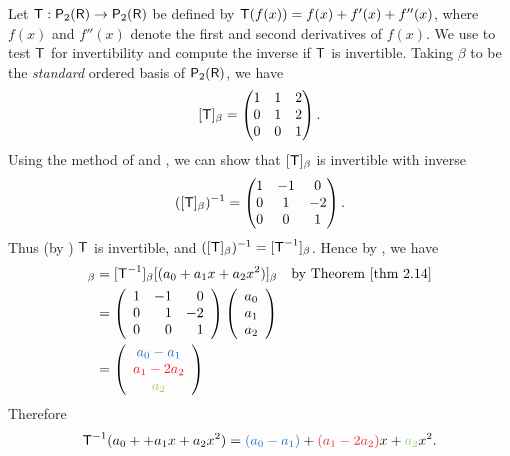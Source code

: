 \begin{example} \label{example 3.2.7}
Let \(\textsf{T}: \textsf{P}_2(\textsf{R}) \to \textsf{P}_2(\textsf{R})\) be defined by \(\textsf{T}(f(x)) = f(x) + f'(x) + f''(x)\),
where \(f(x)\) and \(f''(x)\) denote the first and second derivatives of \(f(x)\).
We use  to test \(\textsf{T}\) for invertibility and compute the inverse if \(\textsf{T}\) is invertible.
Taking \(\beta\) to be the \emph{standard} ordered basis of \(\textsf{P}_2(\textsf{R})\), we have
\[
    [\textsf{T}]_{\beta} = \begin{pmatrix}
        1 & 1 & 2 \\ 0 & 1 & 2 \\ 0 & 0 & 1
    \end{pmatrix}.
\]
Using the method of  and , we can show that \([\textsf{T}]_{\beta}\) is invertible with inverse
\[
    ([\textsf{T}]_{\beta})^{-1} = \begin{pmatrix}
        1 & -1 & 0 \\ 0 & 1 & -2 \\ 0 & 0 & 1
    \end{pmatrix}.
\]
Thus (by ) \(\textsf{T}\) is invertible, and \(([\textsf{T}]_{\beta})^{-1} = [\textsf{T}^{-1}]_{\beta}\).
Hence by , we have
\begin{align*}
    [\T^{-1}(a_0 + a_1 x + a_2 x^2)]_{\beta}
        & = [\T^{-1}]_{\beta} [(a_0 + a_1 x + a_2 x^2)]_{\beta} & \text{by \THM{2.14}} \\
        & = \left(\begin{array}{rrr}
                1 & -1 & 0 \\
                0 & 1 & -2 \\
                0 & 0 & 1
            \end{array}\right)
            \left(\begin{array}{l}
                a_0 \\ a_1 \\ a_2
            \end{array}\right) \\
        & = \left(\begin{array}{c}
                \BLUE{a_0 - a_1} \\ \RED{a_1 - 2 a_2} \\ \GREEN{a_2}
            \end{array}\right)
\end{align*}
Therefore
\[
    \T^{-1}(a_0 + + a_1 x + a_2 x^2) = \BLUE{(a_0 - a_1)} + \RED{(a_1 - 2 a_2)} x + \GREEN{a_2} x^2.
\]
\end{example}